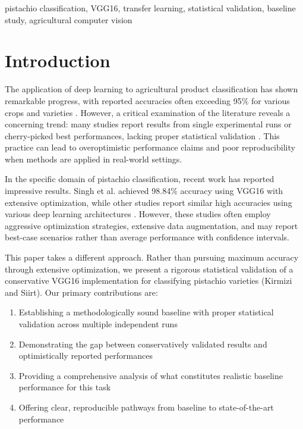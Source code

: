 \documentclass[conference]{IEEEtran}
\begin{document}
\begin{IEEEkeywords}
pistachio classification, VGG16, transfer learning, statistical validation, baseline study, agricultural computer vision
\end{IEEEkeywords}

\section{Introduction}

The application of deep learning to agricultural product classification has shown remarkable progress, with reported accuracies often exceeding 95\% for various crops and varieties \cite{kamilaris2018deep}. However, a critical examination of the literature reveals a concerning trend: many studies report results from single experimental runs or cherry-picked best performances, lacking proper statistical validation \cite{bouthillier2019unreproducible}. This practice can lead to overoptimistic performance claims and poor reproducibility when methods are applied in real-world settings.

In the specific domain of pistachio classification, recent work has reported impressive results. Singh et al. \cite{singh2022pistachio} achieved 98.84\% accuracy using VGG16 with extensive optimization, while other studies report similar high accuracies using various deep learning architectures \cite{ozkan2021classification}. However, these studies often employ aggressive optimization strategies, extensive data augmentation, and may report best-case scenarios rather than average performance with confidence intervals.

This paper takes a different approach. Rather than pursuing maximum accuracy through extensive optimization, we present a rigorous statistical validation of a conservative VGG16 implementation for classifying pistachio varieties (Kirmizi and Siirt). Our primary contributions are:

\begin{enumerate}
    \item Establishing a methodologically sound baseline with proper statistical validation across multiple independent runs
    \item Demonstrating the gap between conservatively validated results and optimistically reported performances
    \item Providing a comprehensive analysis of what constitutes realistic baseline performance for this task
    \item Offering clear, reproducible pathways from baseline to state-of-the-art performance
\end{enumerate}
\end{document}

